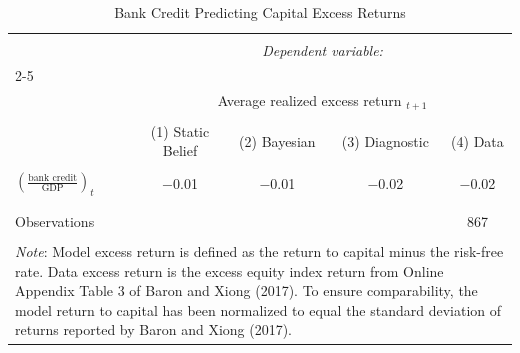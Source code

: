 
\begin{table}[!htbp] \centering 
  \caption{Bank Credit Predicting Capital Excess Returns} 
  \label{bank credit and excess returns} 
\begin{tabular}{@{\extracolsep{10pt}}lcccc} 
\\[-1.8ex]\hline 
\hline \\[-1.8ex] 
 & \multicolumn{4}{c}{\textit{Dependent variable:}} \\ 
\cline{2-5} 
\\[-1.8ex] & \multicolumn{4}{c}{Average realized excess return $_{t+1}$} \\ 
\\[-1.8ex] & (1) Static Belief & (2) Bayesian & (3) Diagnostic  & (4) Data \\
\hline \\[-1.8ex] 
 $(\frac{\text{bank credit}}{\text{GDP}})_t$ & $-$0.01 & $-$0.01 & $-$0.02 & $-$0.02 \\ 
  &  &  &  &  \\ 
 \hline \\[-1.8ex] 
Observations &  &  &  & 867 \\ 
\hline 
\hline \\[-1.8ex] 
\multicolumn{5}{p{0.9\textwidth}}{\footnotesize \textit{Note}: 
  Model excess return is defined as the return to capital minus the risk-free rate. Data excess return is the excess 
equity index return from Online Appendix Table 3 of Baron and Xiong (2017). To ensure comparability, the model return 
to capital has been normalized to equal the standard deviation of returns reported by Baron and Xiong (2017).
}  
\end{tabular} 
\end{table} 
